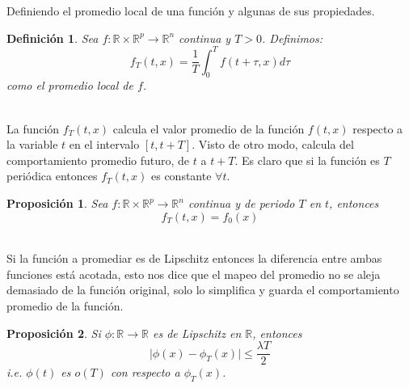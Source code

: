 \documentclass[12pt, a4paper]{report}
\providecommand{\abs}[1]{\lvert#1\rvert}
\newtheorem{definition}{Definición}
\newtheorem{proposition}{Proposición}
\begin{document}
Definiendo el promedio local de una función y algunas de sus propiedades. 

\begin{definition}
	Sea $f:\mathbb{R}\times\mathbb{R}^p\to\mathbb{R}^n$ continua y $T>0$.
	Definimos:
	$$
		f_T(t,x)=\frac{1}{T}\int_{0}^{T}f(t+\tau,x)d\tau
	$$
	como el promedio local de $f$.
\end{definition}
\\
La función $f_T(t,x)$ calcula el valor promedio de la 
función $f(t,x)$ respecto a la variable $t$ en el intervalo $[t,t+T]$. 
Visto de otro modo, calcula del comportamiento promedio futuro, de $t$ a $t+T$. 
Es claro que si la función es $T$ periódica entonces $f_T(t,x)$ es constante $\forall t$.

\begin{proposition}
	Sea $f:\mathbb{R}\times\mathbb{R}^p\to\mathbb{R}^n$ continua y de periodo $T$ en $t$, entonces
	$$
		f_T(t,x)=f_0(x)
	$$
\end{proposition}
\\
Si la función a promediar es de Lipschitz entonces la diferencia entre ambas 
funciones está acotada, esto nos dice que el mapeo del promedio no se aleja demasiado 
de la función original, solo lo simplifica y guarda el comportamiento promedio
 de la función. 
\begin{proposition}
	Si $\phi:\mathbb{R}\to\mathbb{R}$ es de Lipschitz en $\mathbb{R}$, entonces
	$$
		\abs{\phi(x)-\phi_T(x)}\leq\frac{\lambda T}{2}
	$$
	i.e. $\phi(t)$ es $o(T)$ con respecto a $\phi_T(x)$.
\end{proposition}
\\
\end{document}
